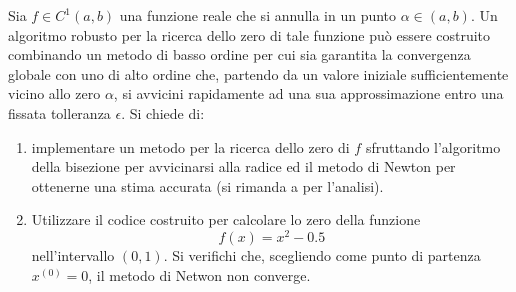 Sia $f\in C^{1}\left(a, b\right)$ una funzione reale che si annulla in
un punto $\alpha\in (a, b)$. Un algoritmo robusto per la
ricerca dello zero di tale funzione pu\`o essere costruito combinando
un metodo di basso ordine per cui sia garantita la convergenza globale
con uno di alto ordine che, partendo da un valore iniziale
sufficientemente vicino allo zero $\alpha$, si avvicini rapidamente ad
una sua approssimazione entro una fissata tolleranza $\epsilon$. Si
chiede di:
\begin{enumerate}
\item implementare un metodo per la ricerca dello zero di $f$
  sfruttando l'algoritmo della bisezione per avvicinarsi alla radice
  ed il metodo di Newton per ottenerne una stima accurata (si rimanda
  a \cite{Quarteroni.Sacco.ea:2000} per l'analisi).
\item Utilizzare il codice costruito per calcolare lo zero della
  funzione 
  \begin{equation*}
    f(x) = x^2 - 0.5
  \end{equation*}
  nell'intervallo $(0, 1)$. Si verifichi che, scegliendo come
  punto di partenza $x^{\left(0\right)} = 0$, il metodo di Netwon non
  converge. 
\end{enumerate}
